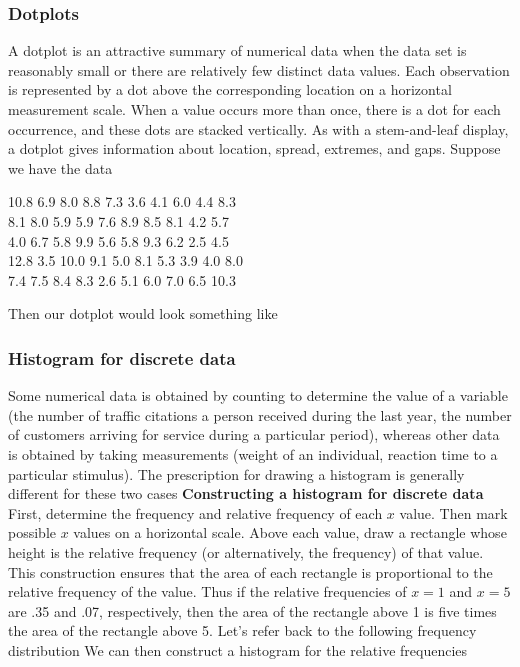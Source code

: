 \documentclass{report}
\begin{document}
\pagebreak 
\subsubsection{Dotplots}
\bigbreak \noindent 
A dotplot is an attractive summary of numerical data when the data set is reasonably
small or there are relatively few distinct data values. Each observation is represented
by a dot above the corresponding location on a horizontal measurement scale. When
a value occurs more than once, there is a dot for each occurrence, and these dots are
stacked vertically. As with a stem-and-leaf display, a dotplot gives information about
location, spread, extremes, and gaps.
\bigbreak \noindent 
Suppose we have the data
\bigbreak \noindent 
\begin{center}
    10.8 6.9 8.0 8.8 7.3 3.6 4.1 6.0 4.4 8.3 \\
    8.1 8.0 5.9 5.9 7.6 8.9 8.5 8.1 4.2 5.7 \\
    4.0 6.7 5.8 9.9 5.6 5.8 9.3 6.2 2.5 4.5 \\
    12.8 3.5 10.0 9.1 5.0 8.1 5.3 3.9 4.0 8.0 \\
    7.4 7.5 8.4 8.3 2.6 5.1 6.0 7.0 6.5 10.3
\end{center}
\bigbreak \noindent 
Then our dotplot would look something like
\bigbreak \noindent 
{}




\pagebreak 
\subsubsection{Histogram for discrete data}
\bigbreak \noindent 
Some numerical data is obtained by counting to determine the value of a variable (the
number of traffic citations a person received during the last year, the number of customers arriving for service during a particular period), whereas other data is obtained by
taking measurements (weight of an individual, reaction time to a particular stimulus).
The prescription for drawing a histogram is generally different for these two cases
\bigbreak \noindent 
\textbf{Constructing a histogram for discrete data}
\bigbreak \noindent 
First, determine the frequency and relative frequency of each $x$ value. Then mark
possible $x$ values on a horizontal scale. Above each value, draw a rectangle whose
height is the relative frequency (or alternatively, the frequency) of that value.
\bigbreak \noindent 
This construction ensures that the area of each rectangle is proportional to the relative frequency of the value. Thus if the relative frequencies of $x=1$ and $x=5$ are
.35 and .07, respectively, then the area of the rectangle above 1 is five times the area
of the rectangle above 5.
\bigbreak \noindent 
Let's refer back to the following frequency distribution
\bigbreak \noindent 
{}
\bigbreak \noindent 
We can then construct a histogram for the relative frequencies
\bigbreak \noindent 
{}
\end{document}
